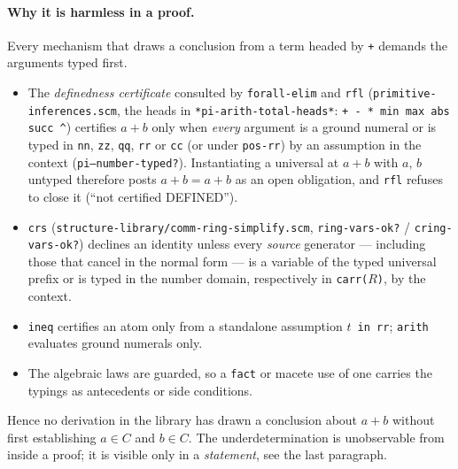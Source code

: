 \paragraph{Why it is harmless in a proof.}
Every mechanism that draws a conclusion from a term headed by \texttt{+}
demands the arguments typed first.
\begin{itemize}
\item The \emph{definedness certificate} consulted by \texttt{forall-elim}
  and \texttt{rfl} (\texttt{primitive-inferences.scm}, the heads in
  \texttt{*pi-arith-total-heads*}: \texttt{+ - * min max abs succ \^{}})
  certifies $a + b$ only when \emph{every} argument is a ground numeral or is
  typed in \texttt{nn}, \texttt{zz}, \texttt{qq}, \texttt{rr} or \texttt{cc}
  (or under \texttt{pos-rr}) by an assumption in the context
  (\texttt{pi--number-typed?}).  Instantiating a universal at $a + b$ with
  $a$, $b$ untyped therefore posts $a + b = a + b$ as an open obligation, and
  \texttt{rfl} refuses to close it (``not certified DEFINED'').
\item \texttt{crs} (\texttt{structure-library/comm-ring-simplify.scm},
  \texttt{ring-vars-ok?} / \texttt{cring-vars-ok?}) declines an identity
  unless every \emph{source} generator --- including those that cancel in the
  normal form --- is a variable of the typed universal prefix or is typed in
  the number domain, respectively in \texttt{carr($R$)}, by the context.
\item \texttt{ineq} certifies an atom only from a standalone assumption
  \texttt{$t$ in rr}; \texttt{arith} evaluates ground numerals only.
\item The algebraic laws are guarded, so a \texttt{fact} or macete use of one
  carries the typings as antecedents or side conditions.
\end{itemize}
Hence no derivation in the library has drawn a conclusion about $a + b$
without first establishing $a \in C$ and $b \in C$.  The underdetermination
is unobservable from inside a proof; it is visible only in a
\emph{statement}, see the last paragraph.

